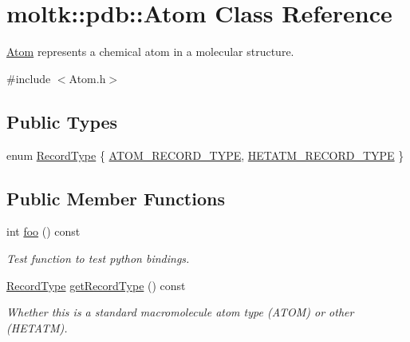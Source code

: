 \hypertarget{classmoltk_1_1pdb_1_1Atom}{
\section{moltk\-:\-:pdb\-:\-:\-Atom \-Class \-Reference}
\label{classmoltk_1_1pdb_1_1Atom}
}


\hyperlink{classmoltk_1_1pdb_1_1Atom}{\-Atom} represents a chemical atom in a molecular structure.  




{\ttfamily \#include $<$\-Atom.\-h$>$}

\subsection*{\-Public \-Types}
\begin{DoxyCompactItemize}
\item 
enum \hyperlink{classmoltk_1_1pdb_1_1Atom_a424f8608509c0d143813e2b02269e499}{\-Record\-Type} \{ \hyperlink{classmoltk_1_1pdb_1_1Atom_a424f8608509c0d143813e2b02269e499a526b69e1c2da04c896037e40dc5bdc0e}{\-A\-T\-O\-M\-\_\-\-R\-E\-C\-O\-R\-D\-\_\-\-T\-Y\-P\-E}, 
\hyperlink{classmoltk_1_1pdb_1_1Atom_a424f8608509c0d143813e2b02269e499af4f8ecc7bc83aa39f50332c66e15a548}{\-H\-E\-T\-A\-T\-M\-\_\-\-R\-E\-C\-O\-R\-D\-\_\-\-T\-Y\-P\-E}
 \}
\end{DoxyCompactItemize}
\subsection*{\-Public \-Member \-Functions}
\begin{DoxyCompactItemize}
\item 
int \hyperlink{classmoltk_1_1pdb_1_1Atom_af80e1dbd9462be468fc3b43a29ac25f4}{foo} () const 
\begin{DoxyCompactList}\small\item\em \-Test function to test python bindings. \end{DoxyCompactList}\item 
\hyperlink{classmoltk_1_1pdb_1_1Atom_a424f8608509c0d143813e2b02269e499}{\-Record\-Type} \hyperlink{classmoltk_1_1pdb_1_1Atom_ad38179561e11000cb3bb73d1555cb153}{get\-Record\-Type} () const 
\begin{DoxyCompactList}\small\item\em \-Whether this is a standard macromolecule atom type (\-A\-T\-O\-M) or other (\-H\-E\-T\-A\-T\-M). \end{DoxyCompactList}\end{DoxyCompactItemize}
